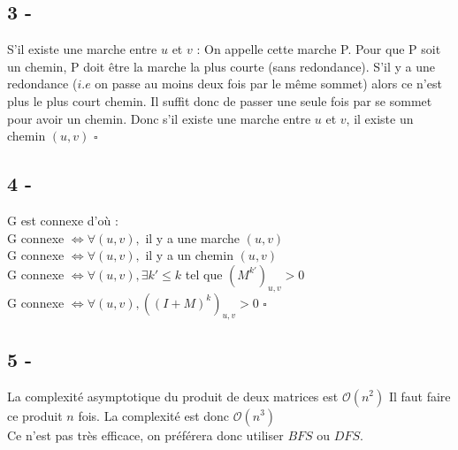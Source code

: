 \documentclass{article}
\begin{document}
        \subsection*{3 -}
            S'il existe une marche entre $u$ et $v$ :
            On appelle cette marche P.
            Pour que P soit un chemin, P doit être la marche la plus courte (sans redondance).
            S'il y a une redondance ($i.e$ on passe au moins deux fois par le même sommet)
            alors ce n'est plus le plus court chemin. Il suffit donc de passer une seule fois par se sommet
            pour avoir un chemin.
            Donc s'il existe une marche entre $u$ et $v$, il existe un chemin $(u,v)$
            $\square$
        \subsection*{4 -}
            G est connexe d'où :\\
            G connexe $\Leftrightarrow \forall (u,v),$ il y a une marche $(u,v)$\\
            G connexe $\Leftrightarrow \forall (u,v),$ il y a un chemin $(u,v)$\\
            G connexe $\Leftrightarrow \forall (u,v), \exists k' \le k$ tel que $\left(M^{k'}\right)_{u,v}>0$\\
            G connexe $\Leftrightarrow \forall (u,v), \left( \left(I+M\right)^{k} \right)_{u,v} > 0$
            $\square$
        \subsection*{5 -}
            La complexité asymptotique du produit de deux matrices est $\mathcal{O}(n^{2})$
            Il faut faire ce produit $n$ fois. La complexité est donc $\mathcal{O}(n^{3})$\\
            Ce n'est pas très efficace, on préférera donc utiliser $BFS$ ou $DFS$.
\end{document}
